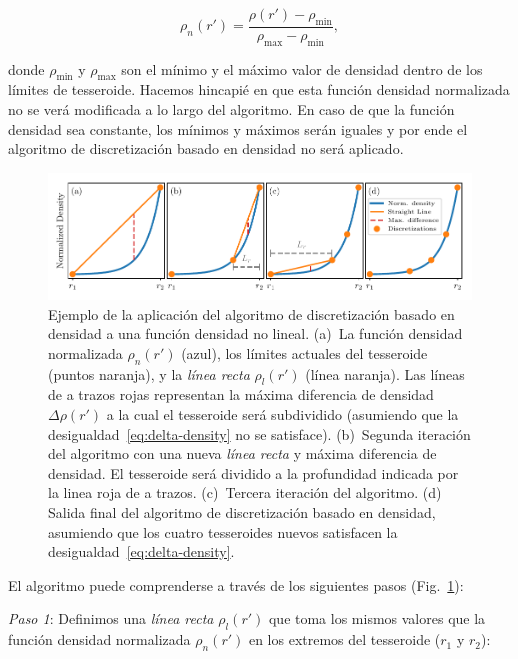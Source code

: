 \begin{equation}
    \rho_n(r') =
    \frac{\rho(r') - \rho_\text{min}}{\rho_\text{max} - \rho_\text{min}},
\end{equation}

\noindent donde $\rho_\text{min}$ y $\rho_\text{max}$ son el mínimo y el máximo
valor de densidad dentro de los límites de tesseroide.
Hacemos hincapié en que esta función densidad normalizada no se verá modificada
a lo largo del algoritmo.
En caso de que la función densidad sea constante, los mínimos y máximos serán
iguales y por ende el algoritmo de discretización basado en densidad no será
aplicado.

\begin{figure}
\centering
\includegraphics[width=\linewidth]
    {figs/tesseroids-variable-density/density-based-discretization-algorithm.pdf}
\caption{
    Ejemplo de la aplicación del algoritmo de discretización basado en densidad
    a una función densidad no lineal.
    (a)~La función densidad normalizada $\rho_n(r')$ (azul), los límites
    actuales del tesseroide (puntos naranja), y la \emph{línea recta}
    $\rho_l(r')$ (línea naranja).
    Las líneas de a trazos rojas representan la máxima diferencia de densidad
    $\Delta \rho (r')$ a la cual el tesseroide será subdividido (asumiendo que
    la desigualdad~\ref{eq:delta-density} no se satisface).
    (b)~Segunda iteración del algoritmo con una nueva \emph{línea recta} y máxima
    diferencia de densidad. El tesseroide será dividido a la profundidad
    indicada por la linea roja de a trazos.
    (c)~Tercera iteración del algoritmo.
    (d)~ Salida final del algoritmo de discretización basado en densidad,
    asumiendo que los cuatro tesseroides nuevos satisfacen la
    desigualdad~\ref{eq:delta-density}.
}
\label{fig:density-discretization-algorithm}
\end{figure}


El algoritmo puede comprenderse a través de los siguientes pasos
(Fig.~\ref{fig:density-discretization-algorithm}):

\textit{Paso 1}:
Definimos una \emph{línea recta} $\rho_l(r')$ que toma los mismos valores que
la función densidad normalizada $\rho_n(r')$ en los extremos del tesseroide
($r_1$ y $r_2$):

